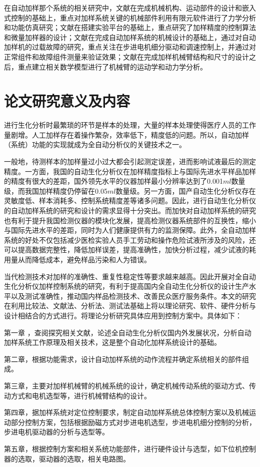 在自动加样那个系统的相关研究中，文献\supercite{bib2}在完成机械机构、运动部件的设计和嵌入式控制的基础上，重点对加样系统关键的机械部件利用有限元软件进行了力学分析和功能仿真研究；文献\supercite{bib3}在搭建实验平台的基础上，重点研究了加样精度的控制算法和微量加样器的设计；文献\supercite{bib8}在完成自动加样系统的机械设计的基础上，通过对自动加样机的过载故障的研究，重点关注在步进电机细分驱动和调速控制上，并通过对正常组件和故障组件测量来验证效果；文献\supercite{bib9}在完成加样机械臂结构和尺寸的设计之后，重点建立相关数学模型进行了机械臂的运动学和动力学分析。
\section{论文研究意义及内容}
进行生化分析时最繁琐的环节是样本的处理，大量的样本处理使得医疗人员的工作量剧增。人工加样存在着操作繁杂，效率低下，精度低的问题。所以，自动加样（系统）功能的实现就成为全自动分析仪的关键技术之一。

一般地，待测样本的加样量过小过大都会引起测定误差，进而影响试液最后的测定精度。一方面，我国的自动生化分析仪在加样精度指标上与国际先进水平样品加样的精度有很大的差距，国外领先水平的仪器加样最小分辨率达到了0.001$ml$数量级，而我国加样精度仍停留在0.05$ml$数量级。另一方面，国产自动生化分析仪存在灵敏度低、样本消耗多、控制系统精度差等诸多问题。因此，进行自动生化分析仪的自动加样系统的研究和设计的需求显得十分突出。而加快对自动加样系统的研究也有利于提升我国检测仪器的模块化发展，提高检测仪器系统部件的互换性，缩小与国际先进水平的差距，同时为人们健康提供有力的监测保障。此外，全自动加样系统的好处不仅包括减少医检实验人员手工劳动和操作危险试液所涉及的风险，还可以提高数据完整性，降低加样误差，提高准确性，加快分析过程，减少试液的耗用量从而降低成本，避免样品污染和人为错误。

当代检测技术对加样的准确性、重复性稳定性等要求越来越高。因此开展对全自动生化分析仪加样控制系统的研究，有利于提高国内全自动生化分析仪的设计生产水平以及测试准确性，推动国内样品检测技术、改善民众医疗服务条件。本文的研究在利用比较法、文献法、分析法、测试法基础上将以理论研究、软件、硬件分析与设计相结合的方式进行。将理论分析研究具体应用到控制方案中。具体如下：

第一章 ，查阅探究相关文献，论述全自动生化分析仪国内外发展状况，分析自动加样系统工作原理及相关技术，这是整个自动化加样系统设计的基础。

第二章，根据功能需求，设计自动加样系统的动作流程并确定系统相关的部件组成。

第三章，主要对加样机械臂的机械系统的设计，确定机械传动系统的驱动方式、传动方式和电机选型等，进行机械臂结构的设计。

第四章，据加样系统对定位控制要求，制定自动加样系统总体控制方案以及机械运动部分控制方案，包括根据励磁方式对步进电机选型，步进电机细分控制的分析，步进电机驱动器的分析与选型等。

第五章，根据控制方案和相关系统功能部件，进行硬件设计与选型，如下位机控制器的选取，驱动器的选取，相关电路图。


